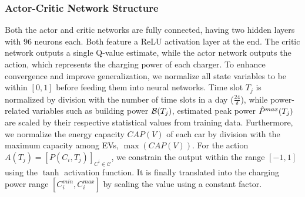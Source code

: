 %
%
%

\subsubsection{Actor-Critic Network Structure} 
Both the actor and critic networks are fully connected, having two hidden layers with 96 neurons each. Both feature a ReLU activation layer at the end. The critic network outputs a single Q-value estimate, while the actor network outputs the action, which represents the charging power of each charger.
%
To enhance convergence and improve generalization, we normalize all state variables to be within $[0, 1]$ before feeding them into neural networks. Time slot $T_j$ is normalized by division with the number of time slots in a day ($\frac{24}{\delta}$), while power-related variables such as building power $\mathcal{B}(T_j)$, estimated peak power $\hat{P}^{max}(T_j)$ are scaled by their respective statistical values from training data. Furthermore, we normalize the energy capacity $CAP(V)$ of each car by division with the maximum capacity among EVs, $\max(CAP(V))$.
For the action $A(T_j)=[P(C_i, T_j)]_{C^{i}\in \mathcal{C}}$, we constrain the output within the range $[-1, 1]$ using the $\tanh$ activation function. It is finally translated into the 
charging power range $[C_i^{min}, C_i^{max}]$ by scaling the value using a constant factor.

